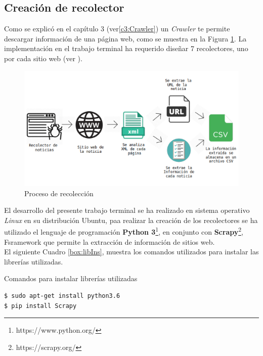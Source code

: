 \subsection{Creación de recolector}

Como se explicó en el capítulo 3 (ver\ref{c3:Crawler}) un \textit{Crawler} te permite descargar información de una página web, como se muestra en la Figura \ref{Fig:recoleccion}. La implementación en el trabajo terminal ha requerido diseñar 7 recolectores, uno por cada sitio web (ver ). \\

\begin{figure}[H]
	\centering
	\includegraphics[scale=.2]{imagenes/Capitulo5/recoleccion.png}
	\caption{Proceso de recolección}
	\label{Fig:recoleccion}
\end{figure}

El desarrollo del presente trabajo terminal se ha realizado en sistema operativo \textit{Linux} en su distribución Ubuntu, paa realizar la creación de los recolectores se ha utilizado el lenguaje de programación \textbf{Python 3}\footnote{https://www.python.org/}, en conjunto con \textbf{Scrapy}\footnote{https://scrapy.org/}, Fsramework que permite la extracción de información de sitios web. 
\\
El siguiente Cuadro \ref{box:libIns}, muestra los comandos utilizados para instalar las librerías utilizadas.\\
\begin{mygraybox}[label={box:libIns}]{Comandos para instalar librerías utilizadas}
\begin{verbatim}
$ sudo apt-get install python3.6
$ pip install Scrapy
\end{verbatim}
\end{mygraybox}

